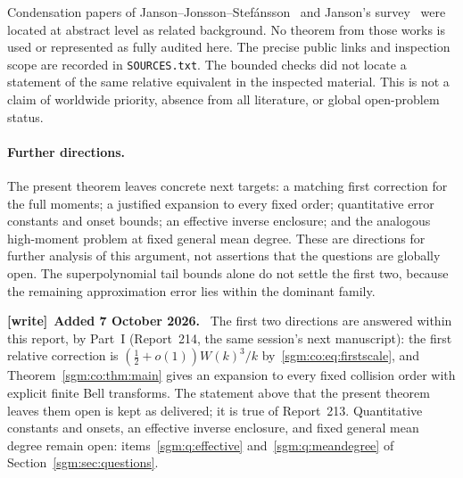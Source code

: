 \documentclass[11pt,letterpaper]{article}
\theoremstyle{remark}\newtheorem{remark}[theorem]{Remark}
\newenvironment{writenote}[1][]{\par\smallskip\begingroup\small
 \noindent\textbf{[write]}\if\relax\detokenize{#1}\relax\else~\textbf{#1.}\fi\ }%
 {\par\endgroup\smallskip}
\theoremstyle{definition}\newtheorem{definition}[theorem]{Definition}
\begin{document}
Condensation papers of Janson--Jonsson--Stef\'ansson~\cite{jjs} and Janson's survey~\cite{janson} were located at abstract level as related background. No theorem from those works is used or represented as fully audited here. The precise public links and inspection scope are recorded in \texttt{SOURCES.txt}. The bounded checks did not locate a statement of the same relative equivalent in the inspected material. This is not a claim of worldwide priority, absence from all literature, or global open-problem status.

\paragraph{Further directions.}
The present theorem leaves concrete next targets: a matching first correction for the full moments; a justified expansion to every fixed order; quantitative error constants and onset bounds; an effective inverse enclosure; and the analogous high-moment problem at fixed general mean degree. These are directions for further analysis of this argument, not assertions that the questions are globally open. The superpolynomial tail bounds alone do not settle the first two, because the remaining approximation error lies within the dominant family.

\begin{writenote}[Added 7 October 2026]
The first two directions are answered within this report, by Part~I (Report~214, the same session's next manuscript): the first relative correction is $(\frac12+o(1))W(k)^3/k$ by~\eqref{sgm:co:eq:firstscale}, and Theorem~\ref{sgm:co:thm:main} gives an expansion to every fixed collision order with explicit finite Bell transforms. The statement above that the present theorem leaves them open is kept as delivered; it is true of Report~213. Quantitative constants and onsets, an effective inverse enclosure, and fixed general mean degree remain open: items~\ref{sgm:q:effective} and~\ref{sgm:q:meandegree} of Section~\ref{sgm:sec:questions}.
\end{writenote}

\appendix{}
\end{document}
